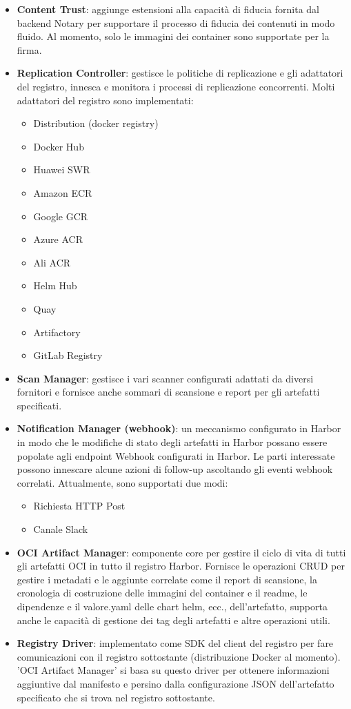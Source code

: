 \documentclass[12pt]{report}
\begin{document}
\begin{itemize}
  \item \textbf{Content Trust}: aggiunge estensioni alla capacità di fiducia fornita dal backend Notary per supportare il processo di fiducia dei contenuti in modo fluido. Al momento, solo le immagini dei container sono supportate per la firma.
  \item \textbf{Replication Controller}: gestisce le politiche di replicazione e gli adattatori del registro, innesca e monitora i processi di replicazione concorrenti. Molti adattatori del registro sono implementati:
  \begin{itemize}
    \item Distribution (docker registry)
    \item Docker Hub
    \item Huawei SWR
    \item Amazon ECR
    \item Google GCR
    \item Azure ACR
    \item Ali ACR
    \item Helm Hub
    \item Quay
    \item Artifactory
    \item GitLab Registry
  \end{itemize}
  \item \textbf{Scan Manager}: gestisce i vari scanner configurati adattati da diversi fornitori e fornisce anche sommari di scansione e report per gli artefatti specificati.
  \item \textbf{Notification Manager (webhook)}: un meccanismo configurato in Harbor in modo che le modifiche di stato degli artefatti in Harbor possano essere popolate agli endpoint Webhook configurati in Harbor. Le parti interessate possono innescare alcune azioni di follow-up ascoltando gli eventi webhook correlati. Attualmente, sono supportati due modi:
  \begin{itemize}
    \item Richiesta HTTP Post
    \item Canale Slack
  \end{itemize}
  \item \textbf{OCI Artifact Manager}: componente core per gestire il ciclo di vita di tutti gli artefatti OCI in tutto il registro Harbor. Fornisce le operazioni CRUD per gestire i metadati e le aggiunte correlate come il report di scansione, la cronologia di costruzione delle immagini del container e il readme, le dipendenze e il valore.yaml delle chart helm, ecc., dell'artefatto, supporta anche le capacità di gestione dei tag degli artefatti e altre operazioni utili.
  \item \textbf{Registry Driver}: implementato come SDK del client del registro per fare comunicazioni con il registro sottostante (distribuzione Docker al momento). 'OCI Artifact Manager' si basa su questo driver per ottenere informazioni aggiuntive dal manifesto e persino dalla configurazione JSON dell'artefatto specificato che si trova nel registro sottostante.
\end{itemize}
\end{document}
